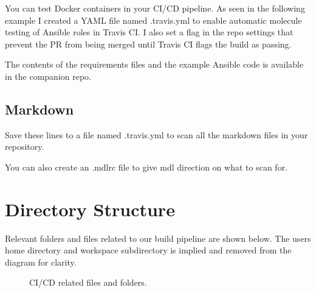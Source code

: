 \justify{}
You can test Docker containers in your CI/CD pipeline. As seen in the
following example I created a YAML file named .travis.yml to enable
automatic molecule testing of Ansible roles in Travis CI. I also set a
flag in the repo settings that prevent the PR from being merged until
Travis CI flags the build as passing.

%	
\justify{}
The contents of the requirements files and the example Ansible code is
available in the companion repo.


\subsection{Markdown}
\justify{}
Save these lines to a file named .travis.yml to scan all the markdown files in your
repository.

%	

\justify{}
You can also create an .mdlrc file to give mdl direction on what to scan for.

%	

\clearpage

\section{Directory Structure}

\justify{}
Relevant folders and files related to our build pipeline are shown below. The users
home directory
and workspace subdirectory is implied and removed from the diagram for clarity.

\begin{figure}[!htb]
	
	\caption{CI/CD related files and folders.}
\label{cicdfiles}
\end{figure}
